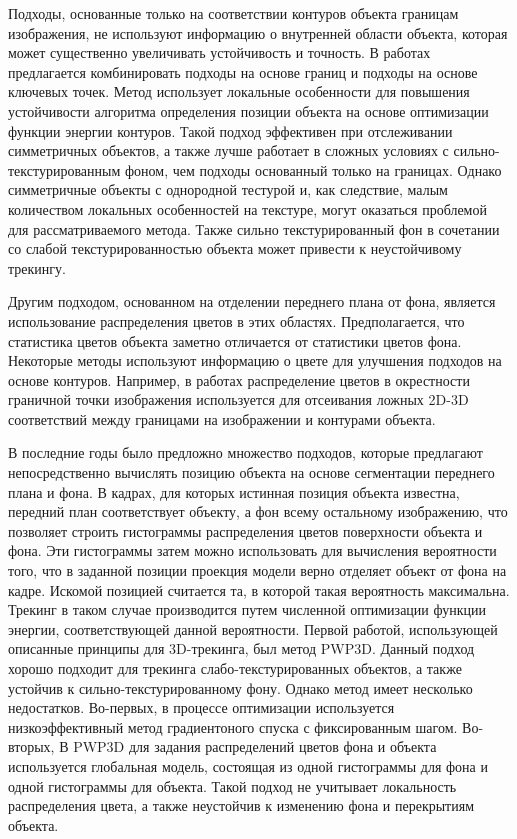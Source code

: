 Подходы, основанные только на соответствии контуров объекта границам
изображения,
не используют информацию о внутренней области объекта, которая может существенно
увеличивать устойчивость и точность. В работах
\cite{VacchettiEdges2004,ChoiFeaturesAndEdges,Bugaev_2018_ECCV} предлагается
комбинировать подходы на основе границ и подходы на основе ключевых точек. Метод
\cite{Bugaev_2018_ECCV} использует локальные особенности для повышения
устойчивости алгоритма определения позиции объекта на основе оптимизации функции
энергии контуров. Такой подход эффективен при отслеживании симметричных
объектов, а также лучше работает в сложных условиях с сильно-текстурированным
фоном, чем подходы основанный только на границах. Однако симметричные объекты с
однородной тестурой и, как следствие, малым количеством локальных особенностей
на текстуре, могут оказаться проблемой для рассматриваемого метода. Также сильно
текстурированный фон в сочетании со слабой текстурированностью объекта может
привести к неустойчивому трекингу.

Другим подходом, основанном на отделении переднего плана от фона,
является использование распределения цветов в этих областях. Предполагается, что
статистика цветов объекта заметно отличается от статистики цветов фона.
Некоторые методы \cite{SeoHinterstoisser2014,WangZhong2015,Zhong2018} используют
информацию о цвете для улучшения подходов на основе контуров. Например, в
работах \cite{SeoHinterstoisser2014,WangZhong2015} распределение цветов в
окрестности граничной точки изображения используется для отсеивания ложных 2D-3D
соответствий между границами на изображении и контурами объекта.

В последние годы было предложно множество подходов, которые предлагают
непосредственно вычислять позицию объекта на основе сегментации переднего плана
и фона. В кадрах, для которых истинная позиция объекта известна, передний план
соответствует объекту, а фон всему остальному изображению, что позволяет
строить гистограммы распределения цветов поверхности объекта и фона.
Эти гистограммы затем можно использовать для вычисления вероятности того, что в
заданной позиции проекция модели верно отделяет объект от фона на кадре.
Искомой позицией считается та, в которой такая вероятность максимальна.
Трекинг в таком случае производится путем численной оптимизации функции
энергии, соответствующей данной вероятности.
Первой работой, использующей описанные принципы для 3D-трекинга,
был метод PWP3D\cite{PWP3D}. Данный подход хорошо подходит для трекинга
слабо-текстурированных объектов, а также устойчив к сильно-текстурированному
фону. Однако метод имеет несколько недостатков.
Во-первых, в процессе оптимизации используется низкоэффективный метод
градиентоного спуска с фиксированным шагом. Во-вторых, В PWP3D для задания
распределений цветов фона и объекта используется глобальная модель, состоящая из
одной гистограммы для фона и одной гистограммы для объекта. Такой подход не
учитывает локальность распределения цвета, а также неустойчив к изменению фона и
перекрытиям объекта.

